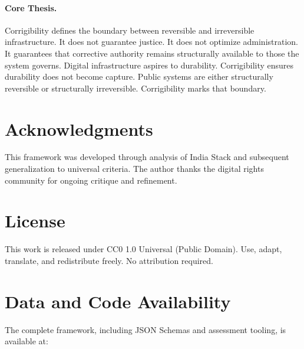 \documentclass{article}
\begin{document}
\paragraph{Core Thesis.} Corrigibility defines the boundary between reversible and irreversible infrastructure. It does not guarantee justice. It does not optimize administration. It guarantees that corrective authority remains structurally available to those the system governs. Digital infrastructure aspires to durability. Corrigibility ensures durability does not become capture. Public systems are either structurally reversible or structurally irreversible. Corrigibility marks that boundary.

\section*{Acknowledgments}

This framework was developed through analysis of India Stack and subsequent generalization to universal criteria. The author thanks the digital rights community for ongoing critique and refinement.

\section*{License}

This work is released under CC0 1.0 Universal (Public Domain). Use, adapt, translate, and redistribute freely. No attribution required.

\section*{Data and Code Availability}

The complete framework, including JSON Schemas and assessment tooling, is available at:
\end{document}
